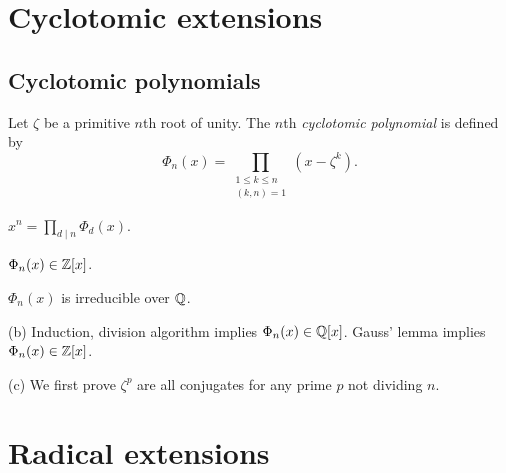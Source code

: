 \documentclass{../../large}
\begin{document}
\chapter{Cyclotomic extensions}
\section{Cyclotomic polynomials}

\begin{prb}
Let $\zeta$ be a primitive $n$th root of unity.
The $n$th \emph{cyclotomic polynomial} is defined by
\[\Phi_n(x)=\prod_{\substack{1\le k\le n\\(k,n)=1}}(x-\zeta^k).\]
\begin{parts}
\item $x^n=\prod_{d\mid n}\Phi_d(x)$.
\item $\Phi_n(x)\in\mathbb{Z}[x]$.
\item $\Phi_n(x)$ is irreducible over $\mathbb{Q}$.
\end{parts}
\end{prb}
\begin{pf}

(b)
Induction, division algorithm implies $\Phi_n(x)\in\mathbb{Q}[x]$.
Gauss' lemma implies $\Phi_n(x)\in\mathbb{Z}[x]$.

(c)
We first prove $\zeta^p$ are all conjugates for any prime $p$ not dividing $n$.
\end{pf}



\begin{prb}

\end{prb}






\chapter{Radical extensions}
\end{document}
